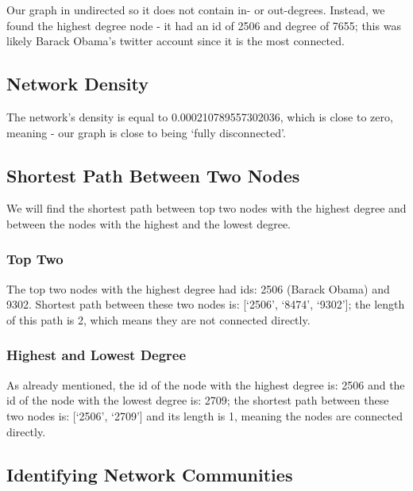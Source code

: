 \documentclass[
]{article}
\begin{document}
Our graph in undirected so it does not contain in- or out-degrees.
Instead, we found the highest degree node - it had an id of 2506 and
degree of 7655; this was likely Barack Obama's twitter account since it
is the most connected.

\hypertarget{network-density}{%
\subsection{Network Density}\label{network-density}}

The network's density is equal to 0.000210789557302036, which is close
to zero, meaning - our graph is close to being `fully disconnected'.

\hypertarget{shortest-path-between-two-nodes}{%
\subsection{Shortest Path Between Two
Nodes}\label{shortest-path-between-two-nodes}}

We will find the shortest path between top two nodes with the highest
degree and between the nodes with the highest and the lowest degree.

\hypertarget{top-two}{%
\subsubsection{Top Two}\label{top-two}}

The top two nodes with the highest degree had ids: 2506 (Barack Obama)
and 9302. Shortest path between these two nodes is: {[}`2506', `8474',
`9302'{]}; the length of this path is 2, which means they are not
connected directly.

\hypertarget{highest-and-lowest-degree}{%
\subsubsection{Highest and Lowest
Degree}\label{highest-and-lowest-degree}}

As already mentioned, the id of the node with the highest degree is:
2506 and the id of the node with the lowest degree is: 2709; the
shortest path between these two nodes is: {[}`2506', `2709'{]} and its
length is 1, meaning the nodes are connected directly.

\hypertarget{identifying-network-communities}{%
\subsection{Identifying Network
Communities}\label{identifying-network-communities}}
\end{document}

